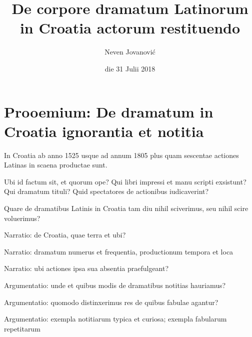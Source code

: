 \documentclass[14pt]{beamer}
\title{De corpore dramatum Latinorum in Croatia actorum restituendo}
\date{die 31 Julii 2018}
\author{Neven Jovanović}
\institute{Facultas philosophica Universitatis Zagrabiensis}
\begin{document}
  \maketitle
  


\begin{frame}
\tableofcontents
\end{frame}

\section{Prooemium: De dramatum in Croatia ignorantia et notitia}

\begin{frame}
  In Croatia ab anno 1525 usque ad annum 1805 plus quam sescentae actiones Latinas in scaena productae sunt.
\end{frame}

\begin{frame}
  Ubi id factum sit, et quorum ope?
  Qui libri impressi et manu scripti exsistunt?
  Qui dramatum tituli?
  Quid spectatores de actionibus iudicaverint?
\end{frame}

\begin{frame}
  Quare de dramatibus Latinis in Croatia tam diu nihil sciverimus, seu nihil scire voluerimus?
\end{frame}

\begin{frame}
Narratio: de Croatia, quae terra et ubi?
\end{frame}

\begin{frame}
Narratio: dramatum numerus et frequentia, productionum tempora et loca
\end{frame}

\begin{frame}
Narratio: ubi actiones ipsa sua absentia praefulgeant?
\end{frame}

\begin{frame}
Argumentatio: unde et quibus modis de dramatibus notitias hauriamus?
\end{frame}

\begin{frame}
Argumentatio: quomodo distinxerimus res de quibus fabulae agantur?
\end{frame}

\begin{frame}
  Argumentatio: exempla notitiarum typica et curiosa; exempla fabularum repetitarum
  
\end{frame}
\end{document}
